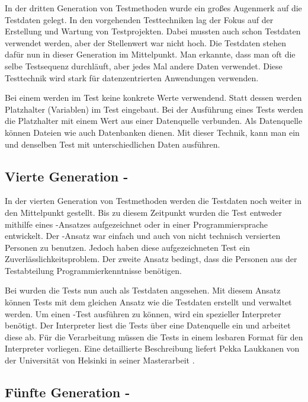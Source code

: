In der dritten Generation von Testmethoden wurde ein großes Augenmerk auf die Testdaten gelegt. In den vorgehenden Testtechniken lag der Fokus auf der Erstellung und Wartung von Testprojekten. Dabei mussten auch schon Testdaten verwendet werden, aber der Stellenwert war nicht hoch. Die Testdaten stehen dafür nun in dieser Generation im Mittelpunkt. Man erkannte, dass man oft die selbe Testsequenz durchläuft, aber jedes Mal andere Daten verwendet. Diese Testtechnik wird stark für datenzentrierten Anwendungen verwenden. 

\SuperPar
Bei einem  werden im Test keine konkrete Werte verwendend. Statt dessen werden Platzhalter (Variablen) im Test eingebaut. Bei der Ausführung eines Tests werden die Platzhalter mit einem Wert aus einer Datenquelle verbunden. Als Datenquelle können Dateien wie auch Datenbanken dienen. Mit dieser Technik, kann man ein und denselben Test mit unterschiedlichen Daten ausführen. 

\subsection{Vierte Generation - }

In der vierten Generation von Testmethoden werden die Testdaten noch weiter in den Mittelpunkt gestellt. Bis zu diesem Zeitpunkt wurden die Test entweder mithilfe eines -Ansatzes aufgezeichnet oder in einer Programmiersprache entwickelt. Der -Ansatz war einfach und auch von nicht technisch versierten Personen zu benutzen. Jedoch haben diese aufgezeichneten Test ein Zuverlässlichkeitsproblem. Der zweite Ansatz bedingt, dass die Personen aus der Testabteilung Programmierkenntnisse benötigen.

\SuperPar
Bei  wurden die Tests nun auch als Testdaten angesehen. Mit diesem Ansatz können Tests mit dem gleichen Ansatz wie die Testdaten erstellt und verwaltet werden. Um einen -Test ausführen zu können, wird ein spezieller Interpreter benötigt. Der Interpreter liest die Tests über eine Datenquelle ein und arbeitet diese ab. Für die Verarbeitung müssen die Tests in einem lesbaren Format für den Interpreter vorliegen. Eine detaillierte Beschreibung liefert Pekka Laukkanen von der Universität von Helsinki in seiner Masterarbeit \cite{Lauk06}. 

\subsection{Fünfte Generation - }

